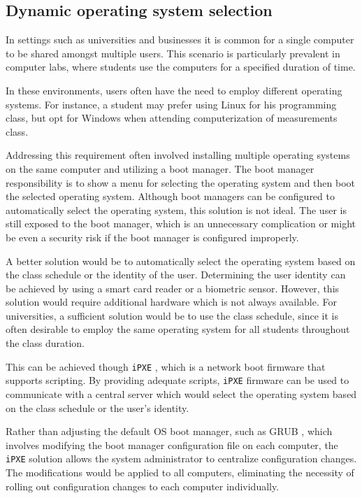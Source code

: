\documentclass[../main.tex]{subfiles}
\begin{document}
\subsection{Dynamic operating system selection}
In settings such as universities and businesses it is common for a single computer to be shared amongst multiple users.
This scenario is particularly prevalent in computer labs, where students use the computers for a specified duration of time.

In these environments, users often have the need to employ different operating systems.
For instance, a student may prefer using Linux for his programming class, but opt for Windows when attending computerization of measurements class.

Addressing this requirement often involved installing multiple operating systems on the same computer and utilizing a boot manager.
The boot manager responsibility is to show a menu for selecting the operating system and then boot the selected operating system.
Although boot managers can be configured to automatically select the operating system, this solution is not ideal.
The user is still exposed to the boot manager, which is an unnecessary complication or might be even a security risk if the boot manager is configured improperly.

A better solution would be to automatically select the operating system based on the class schedule or the identity of the user.
Determining the user identity can be achieved by using a smart card reader or a biometric sensor. However, this solution would
require additional hardware which is not always available. For universities, a sufficient solution would be to use the class schedule,
since it is often desirable to employ the same operating system for all students throughout the class duration.

This can be achieved though \texttt{iPXE} \cite{ipxe}, which is a network boot firmware that supports scripting.
By providing adequate scripts, \texttt{iPXE} firmware can be used to communicate with a central server which would select the operating system based on the class schedule or the user's identity.

Rather than adjusting the default OS boot manager, such as GRUB \cite{grub}, which involves modifying the boot manager configuration file on each computer, the \texttt{iPXE} solution
allows the system administrator to centralize configuration changes. The modifications would be applied to all computers, eliminating the necessity of rolling out configuration changes to each computer individually.
\end{document}
